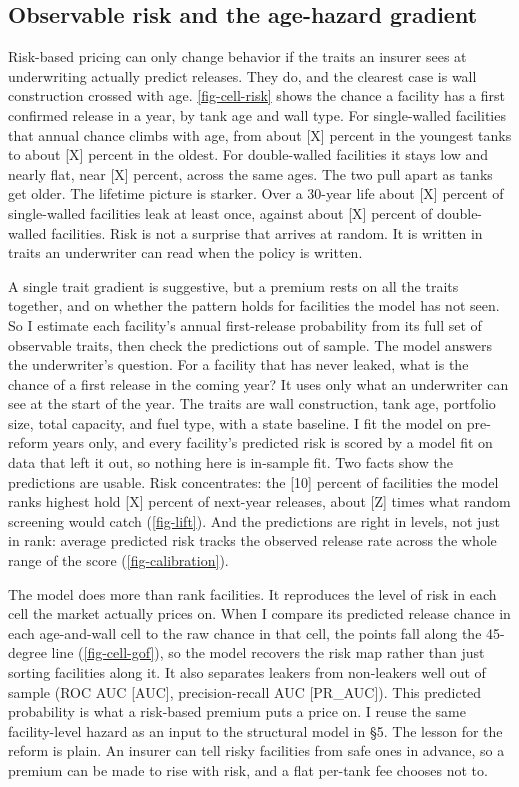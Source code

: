 \documentclass[
  12pt,
]{article}
\begin{document}
\subsection{Observable risk and the age-hazard
gradient}\label{observable-risk-and-the-age-hazard-gradient}

Risk-based pricing can only change behavior if the traits an insurer
sees at underwriting actually predict releases. They do, and the
clearest case is wall construction crossed with age.
\autoref{fig-cell-risk} shows the chance a facility has a first
confirmed release in a year, by tank age and wall type. For
single-walled facilities that annual chance climbs with age, from about
{[}X{]} percent in the youngest tanks to about {[}X{]} percent in the
oldest. For double-walled facilities it stays low and nearly flat, near
{[}X{]} percent, across the same ages. The two pull apart as tanks get
older. The lifetime picture is starker. Over a 30-year life about
{[}X{]} percent of single-walled facilities leak at least once, against
about {[}X{]} percent of double-walled facilities. Risk is not a
surprise that arrives at random. It is written in traits an underwriter
can read when the policy is written.

A single trait gradient is suggestive, but a premium rests on all the
traits together, and on whether the pattern holds for facilities the
model has not seen. So I estimate each facility's annual first-release
probability from its full set of observable traits, then check the
predictions out of sample. The model answers the underwriter's question.
For a facility that has never leaked, what is the chance of a first
release in the coming year? It uses only what an underwriter can see at
the start of the year. The traits are wall construction, tank age,
portfolio size, total capacity, and fuel type, with a state baseline. I
fit the model on pre-reform years only, and every facility's predicted
risk is scored by a model fit on data that left it out, so nothing here
is in-sample fit. Two facts show the predictions are usable. Risk
concentrates: the {[}10{]} percent of facilities the model ranks highest
hold {[}X{]} percent of next-year releases, about {[}Z{]} times what
random screening would catch (\autoref{fig-lift}). And the predictions
are right in levels, not just in rank: average predicted risk tracks the
observed release rate across the whole range of the score
(\autoref{fig-calibration}).

The model does more than rank facilities. It reproduces the level of
risk in each cell the market actually prices on. When I compare its
predicted release chance in each age-and-wall cell to the raw chance in
that cell, the points fall along the 45-degree line
(\autoref{fig-cell-gof}), so the model recovers the risk map rather than
just sorting facilities along it. It also separates leakers from
non-leakers well out of sample (ROC AUC {[}AUC{]}, precision-recall AUC
{[}PR\_AUC{]}). This predicted probability is what a risk-based premium
puts a price on. I reuse the same facility-level hazard as an input to
the structural model in §5. The lesson for the reform is plain. An
insurer can tell risky facilities from safe ones in advance, so a
premium can be made to rise with risk, and a flat per-tank fee chooses
not to.
\end{document}
